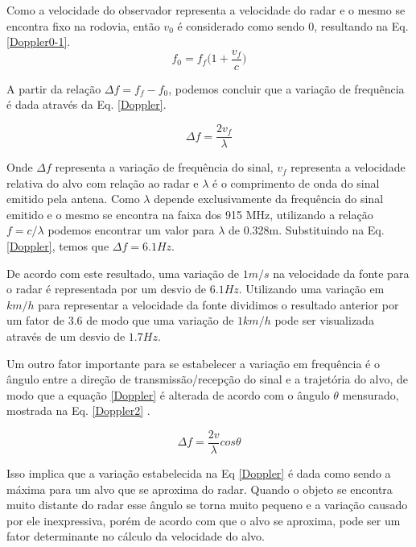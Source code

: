 Como a velocidade do observador representa a velocidade do radar e o mesmo se encontra fixo na rodovia, então $v_0$ é considerado como sendo 0, resultando na Eq. \ref{Doppler0-1}.
\begin{equation}\label{Doppler0-1} 
  f_0 = f_f \Big(1 + \frac{v_f}{c} \Big)
\end{equation}

A partir da relação $\Delta f = f_{f} - f_{0}$, podemos concluir que a variação de frequência é dada através da Eq. \ref{Doppler}.

\begin{equation}\label{Doppler} 
  \Delta f =  \frac{2v_f}{\lambda}
\end{equation} 

Onde $\Delta f$ representa a variação de frequência do sinal, $v_f$ representa a velocidade relativa do alvo com relação ao radar e $\lambda$ é o comprimento de onda do sinal emitido pela antena. Como $\lambda$ depende exclusivamente da frequência do sinal emitido e o mesmo se encontra na faixa dos 915 MHz, utilizando a relação $f=c/\lambda$  podemos encontrar um valor para $\lambda$ de 0.328m. Substituindo na Eq. \ref{Doppler}, temos que $\Delta f = 6.1 Hz$.

De acordo com este resultado, uma variação de $1 m/s$ na velocidade da fonte para o radar é representada por um desvio de $6.1 Hz$. Utilizando uma variação em $km/h$ para representar a velocidade da fonte dividimos o resultado anterior por um fator de 3.6 de modo que uma variação de $1km/h$ pode ser visualizada através de um desvio de $1.7 Hz$.

Um outro fator importante para se estabelecer a variação em frequência é o ângulo entre a direção de transmissão/recepção do sinal e a trajetória do alvo, de modo que a equação \ref{Doppler} é alterada de acordo com o ângulo $\theta$ mensurado, mostrada na Eq. \ref{Doppler2} \cite{radarbasics}.

 \begin{equation}\label{Doppler2} 
  \Delta f =  \frac{2v}{\lambda}cos \theta
\end{equation}

Isso implica que a variação estabelecida na Eq \ref{Doppler} é dada como sendo a máxima para um alvo que se aproxima do radar. Quando o objeto se encontra muito distante do radar esse ângulo se torna muito pequeno e a variação causado por ele inexpressiva, porém de acordo com que o alvo se aproxima, pode ser um fator determinante no cálculo da velocidade do alvo.

